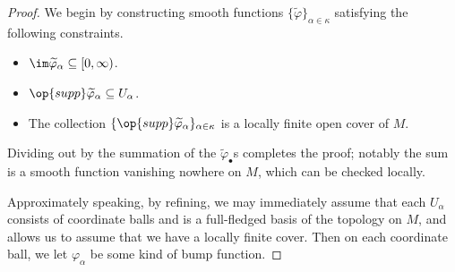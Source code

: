 \documentclass[../notes.tex]{subfiles}
\begin{document}
\begin{proof}
	We begin by constructing smooth functions $\{\widetilde\varphi\}_{\alpha\in\kappa}$ satisfying the following constraints.
	\begin{itemize}
		\item $\im\widetilde\varphi_\alpha\subseteq[0,\infty)$.
		\item $\op{supp}\widetilde\varphi_\alpha\subseteq U_\alpha$.
		\item The collection $\{\op{supp}\widetilde\varphi_\alpha\}_{\alpha\in\kappa}$ is a locally finite open cover of $M$.
	\end{itemize}
	Dividing out by the summation of the $\widetilde\varphi_\bullet$s completes the proof; notably the sum is a smooth function vanishing nowhere on $M$, which can be checked locally.

	Approximately speaking, by refining, we may immediately assume that each $U_\alpha$ consists of coordinate balls and is a full-fledged basis of the topology on $M$, and  allows us to assume that we have a locally finite cover. Then on each coordinate ball, we let $\varphi_\alpha$ be some kind of bump function.
\end{proof}
\end{document}
